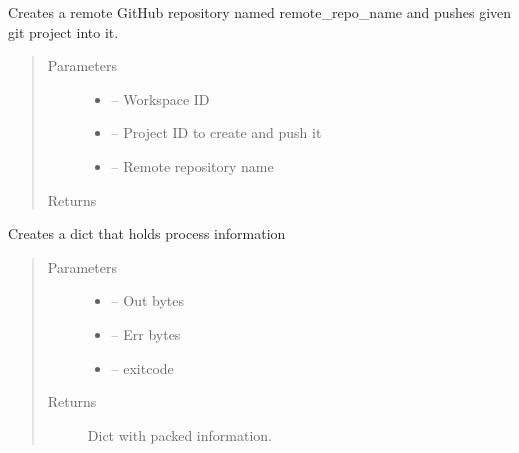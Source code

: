 \documentclass[letterpaper,10pt,english]{sphinxmanual}
\begin{document}

\begin{fulllineitems}
\label{_source/son_editor.impl:son_editor.impl.gitimpl.create_commit_and_push}
Creates a remote GitHub repository named remote\_repo\_name and pushes given git project into it.
\begin{quote}\begin{description}
\item[{Parameters}] \leavevmode\begin{itemize}
\item {} 
 -- Workspace ID

\item {} 
 -- Project ID to create and push it

\item {} 
 -- Remote repository name

\end{itemize}

\item[{Returns}] \leavevmode


\end{description}\end{quote}

\end{fulllineitems}


\begin{fulllineitems}
\label{_source/son_editor.impl:son_editor.impl.gitimpl.create_info_dict}
Creates a dict that holds process information
\begin{quote}\begin{description}
\item[{Parameters}] \leavevmode\begin{itemize}
\item {} 
 -- Out bytes

\item {} 
 -- Err bytes

\item {} 
 -- exitcode

\end{itemize}

\item[{Returns}] \leavevmode
Dict with packed information.

\end{description}\end{quote}

\end{fulllineitems}
\end{document}
